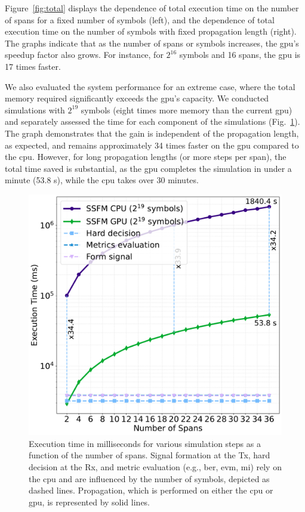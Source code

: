 Figure~\ref{fig:total} displays the dependence of total execution time on the number of spans for a fixed number of symbols (left), and the dependence of total execution time on the number of symbols with fixed propagation length (right). The graphs indicate that as the number of spans or symbols increases, the \acrshort{gpu}'s speedup factor also grows. For instance, for $2^{16}$ symbols and 16 spans, the \acrshort{gpu} is 17 times faster.

We also evaluated the system performance for an extreme case, where the total memory required significantly exceeds the \acrshort{gpu}'s capacity. We conducted simulations with $2^{19}$ symbols (eight times more memory than the current \acrshort{gpu}) and separately assessed the time for each component of the simulations (Fig.~\ref{fig:propagation_time}). The graph demonstrates that the gain is independent of the propagation length, as expected, and remains approximately 34 times faster on the \acrshort{gpu} compared to the \acrshort{cpu}. However, for long propagation lengths (or more steps per span), the total time saved is substantial, as the \acrshort{gpu} completes the simulation in under a minute (53.8 s), while the \acrshort{cpu} takes over 30 minutes.

\begin{figure}[t]
   \centering
        \includegraphics[width=0.6\linewidth]{images/hpcom/propagation.pdf}
    \caption{Execution time in milliseconds for various simulation steps as a function of the number of spans. Signal formation at the Tx, hard decision at the Rx, and metric evaluation (e.g., \acrshort{ber}, \acrshort{evm}, \acrshort{mi}) rely on the \acrshort{cpu} and are influenced by the number of symbols, depicted as dashed lines. Propagation, which is performed on either the \acrshort{cpu} or \acrshort{gpu}, is represented by solid lines.}
    \label{fig:propagation_time}
\end{figure}

